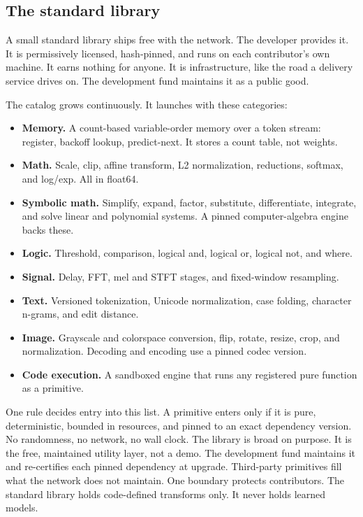 \documentclass[11pt]{article}
\begin{document}
\subsection{The standard library}\label{sec:library}

A small standard library ships free with the network. The
developer provides it. It is permissively licensed, hash-pinned,
and runs on each contributor's own machine. It earns nothing for
anyone. It is infrastructure, like the road a delivery service
drives on. The development fund maintains it as a public good.

The catalog grows continuously. It launches with these categories:

\begin{itemize}
    \item \textbf{Memory.} A count-based variable-order memory over a
          token stream: register, backoff lookup, predict-next. It stores a
          count table, not weights.
    \item \textbf{Math.} Scale, clip, affine transform, L2
          normalization, reductions, softmax, and log/exp. All in float64.
    \item \textbf{Symbolic math.} Simplify, expand, factor,
          substitute, differentiate, integrate, and solve linear and
          polynomial systems. A pinned computer-algebra engine backs these.
    \item \textbf{Logic.} Threshold, comparison, logical and, logical
          or, logical not, and where.
    \item \textbf{Signal.} Delay, FFT, mel and STFT stages, and
          fixed-window resampling.
    \item \textbf{Text.} Versioned tokenization, Unicode
          normalization, case folding, character n-grams, and edit
          distance.
    \item \textbf{Image.} Grayscale and colorspace conversion, flip,
          rotate, resize, crop, and normalization. Decoding and encoding
          use a pinned codec version.
    \item \textbf{Code execution.} A sandboxed engine that runs any
          registered pure function as a primitive.
\end{itemize}

One rule decides entry into this list. A primitive enters only if
it is pure, deterministic, bounded in resources, and pinned to an
exact dependency version. No randomness, no network, no wall
clock. The library is broad on purpose. It is the free,
maintained utility layer, not a demo. The development fund
maintains it and re-certifies each pinned dependency at upgrade.
Third-party primitives fill what the network does not maintain.
One boundary protects contributors. The standard library holds
code-defined transforms only. It never holds learned models.
\end{document}
